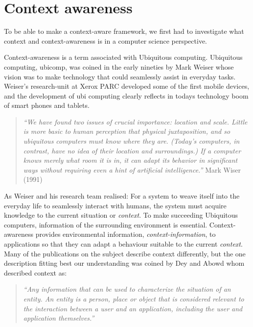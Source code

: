\documentclass[../report.tex]{subfiles}
\begin{document}
\graphicspath{{img/}{../img/}}
\section{Context awareness}
\label{sec:Context awareness}
To be able to make a context-aware framework, we first had to investigate what context and context-awareness is in a computer science perspective.

Context-awareness is a term associated with Ubiquitous computing. Ubiquitous computing, ubicomp, was coined in the early nineties by Mark Weiser whose vision was to make technology that could seamlessly assist in everyday tasks. Weiser's research-unit at Xerox PARC developed some of the first mobile devices, and the development of ubi computing clearly reflects in todays technology boom of smart phones and tablets.

\begin{quote}
\textit{``We have found two issues of crucial importance: location and scale. Little is more basic to human perception that physical juxtaposition, and so ubiquitous computers must know where they are. (Today's computers, in contrast, have no idea of their location and surroundings.) If a computer knows merely what room it is in, it can adapt its behavior in significant ways without requiring even a hint of artificial intelligence.''} Mark Wiser (1991) \cite{Mark Weiser (1991)}
\end{quote} 


As Weiser and his research team realised: For a system to weave itself into the everyday life to seamlessly interact with humans, the system must acquire knowledge to the current situation or \textit{context}. To make succeeding Ubiquitous computers, information of the surrounding environment is essential. Context-awareness provides environmental information, \textit{context-information}, to applications so that they can adapt a behaviour suitable to the current \textit{context}. Many of the publications on the subject describe context differently, but the one description fitting best our understanding was coined by Dey and Abowd whom described context as:

\begin{quote}
\textit{``Any information that can be used to characterize the situation of an entity. An entity is a person, place or object that is considered relevant to the interaction between a user and an application, including the user and application themselves.''} \cite{Dey and Abowd (2000)}
\end{quote} 
\end{document}
